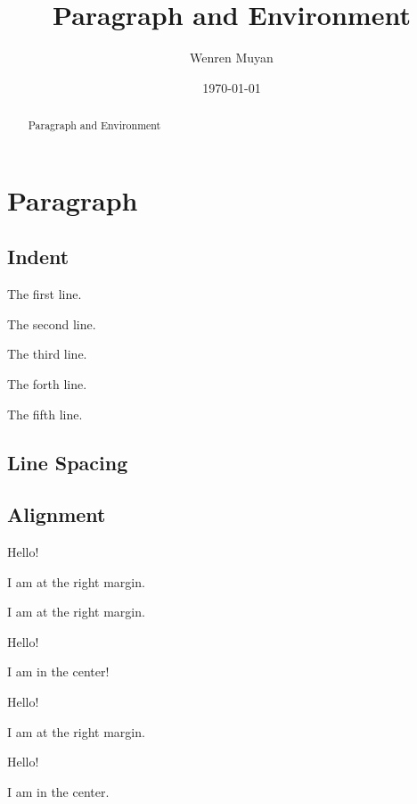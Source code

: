 \documentclass{article}
\title{Paragraph and Environment}
\author{Wenren Muyan}
\date{\today}
\begin{document}
    \maketitle

    \begin{abstract}
        Paragraph and Environment
    \end{abstract}

    \tableofcontents

    \section{Paragraph}
        \subsection{Indent}
            The first line. \par
            The second line. \par
            \noindent The third line. \par
            \indent The forth line. \par
            \indent\indent The fifth line. \par
        \subsection{Line Spacing}
        \subsection{Alignment}
            {
                \raggedleft Hello!\par   %
                \raggedleft I am at the right margin. \par
                \raggedleft I am at the right margin. 
            }\par
            {
                \centering Hello!\par
                \centering I am in the center!
            }
            \begin{flushright}
                Hello!\par
                I am at the right margin. 
            \end{flushright}
            \begin{center}
                Hello!\par
                I am in the center. 
            \end{center}
\end{document}
